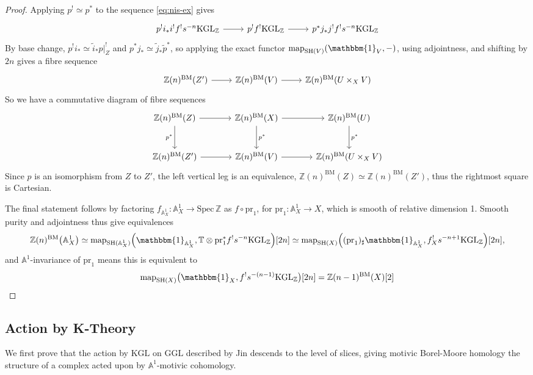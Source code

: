 \documentclass[11pt, twoside]{article}
\numberwithin{equation}{section}
\theoremstyle{definition}
\newcommand{\bb}[1]{\mathbb{#1}}
\newcommand{\spec}{\mathrm{Spec} \,}
\newcommand{\pr}{\mathrm{pr}}
\newcommand{\map}{\mathrm{map}}
\newcommand{\Kgl}{\mathrm{KGL}}
\newcommand{\Ggl}{\mathrm{GGL}}
\newcommand{\sh}{\mathrm{SH}}
\newcommand{\bm}{\mathrm{BM}}
\begin{document}
\begin{proof}
Applying \(p^! \simeq p^*\) to the sequence \ref{eq:nis-ex} gives 
\[\begin{tikzcd} p^! i_* i^! f^! s^{- n} \Kgl_\bb{Z} \ar[r] & p^! f^!\Kgl_\bb{Z} \ar[r] & p^*j_*j^! f^! s^{- n} \Kgl_\bb{Z}
\end{tikzcd}\]
By base change, \(p^! i_* \simeq \tilde{i}_* p|_Z^!\) and \(p^*j_* \simeq \tilde{j}_*\tilde{p}^*\), so applying the exact functor \(\map_{\sh(V)}(\mathbbm{1}_V, -)\), using adjointness, and shifting by \(2n\) gives a fibre sequence 
\[\begin{tikzcd}
\bb{Z}(n)^\bm(Z') \ar[r] & \bb{Z}(n)^\bm(V) \ar[r] & \bb{Z}(n)^\bm(U \times_X V)
\end{tikzcd}\]
So we have a commutative diagram of fibre sequences 
\[\begin{tikzcd} [row sep = large, column sep = large]
\bb{Z}(n)^\bm(Z) \ar[d, "p^*", swap] \ar[r] & \bb{Z}(n)^\bm(X) \ar[d, "p^*"] \ar[r] & \bb{Z}(n)^\bm(U) \ar[d, "p^*"]\\
\bb{Z}(n)^\bm(Z') \ar[r] & \bb{Z}(n)^\bm(V) \ar[r] & \bb{Z}(n)^\bm(U \times_X V)
\end{tikzcd}\]
Since \(p\) is an isomorphism from \(Z\) to \(Z'\), the left vertical leg is an equivalence, \(\bb{Z}(n)^\bm(Z) \simeq \bb{Z}(n)^\bm(Z')\), thus the rightmost square is Cartesian.

The final statement follows by factoring \(f_{\bb{A}_X^1} \colon \bb{A}_X^1 \to \spec \bb{Z}\) as \(f \circ \pr_1\), for \(\pr_1 \colon \bb{A}_X^1 \to X\), which is smooth of relative dimension 1. Smooth purity and adjointness thus give equivalences 
\[\bb{Z}(n)^\bm\big(\bb{A}_X^1\big) \simeq \map_{\sh(\bb{A}_X^1)} \! \left(\mathbbm{1}_{\bb{A}_X^1}, \bb{T} \otimes \pr_1^* f^! s^{- n} \Kgl_\bb{Z}\right)\!\lbrack 2n \rbrack \simeq \map_{\sh(X)} \! \left((\pr_1)_\sharp \mathbbm{1}_{\bb{A}_X^1}, f_X^! s^{- n + 1} \Kgl_\bb{Z}\right)\!\lbrack 2n \rbrack,\]
and \(\bb{A}^1\)-invariance of \(\pr_1\) means this is equivalent to 
\[\map_{\sh(X)}\big(\mathbbm{1}_X, f^! s^{- (n - 1)} \Kgl_\bb{Z}\big)\lbrack 2n \rbrack = \bb{Z}(n - 1)^\bm(X) \lbrack 2 \rbrack\]
\end{proof}

\subsection{Action by K-Theory}\label{K:action}
We first prove that the action by \(\Kgl\) on \(\Ggl\) described by Jin descends to the level of slices, giving motivic Borel-Moore homology the structure of a complex acted upon by \(\bb{A}^1\)-motivic cohomology.
\end{document}
